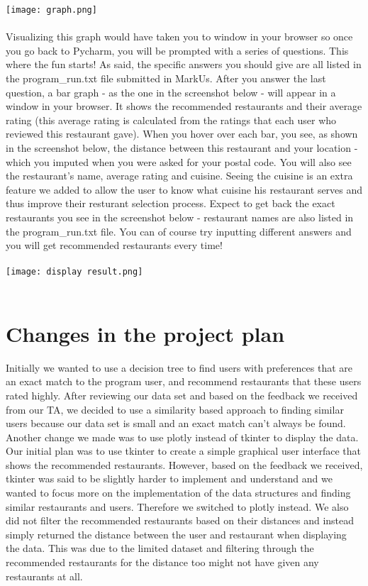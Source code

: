 \documentclass{article}
\begin{document}
\texttt{[image: graph.png]}
\\\\

Visualizing this graph would have taken you to window in your browser so once you go back to Pycharm, you will be prompted with a series of questions. This where the fun starts! As said, the specific answers you should give are all listed in the program\_run.txt file submitted in MarkUs. After you answer the last question, a bar graph - as the one in the screenshot below - will appear in a window in your browser. It shows the recommended restaurants and their average rating (this average rating is calculated from the ratings that each user who reviewed this restaurant gave). When you hover over each bar, you see, as shown in the screenshot below, the distance between this restaurant and your location - which you imputed when you were asked for your postal code. You will also see the restaurant’s name, average rating and cuisine. Seeing the cuisine is an extra feature we added to allow the user to know what cuisine his restaurant serves and thus improve their resturant selection process. Expect to get back the exact restaurants you see in the screenshot below - restaurant names are also listed in the program\_run.txt file. You can of course try inputting different answers and you will get recommended restaurants every time!
\\\\

\texttt{[image: display result.png]}
\\\\

\section{Changes in the project plan}


Initially we wanted to use a decision tree to find users with preferences that are an exact match to the program user, and recommend restaurants that these users rated highly. After reviewing our data set and based on the feedback we received from our TA, we decided to use a similarity based approach to finding similar users because our data set is small and an exact match can’t  always be found. Another change we made was to use plotly instead of tkinter to display the data. Our initial plan was to use tkinter to create a simple graphical user interface that shows the recommended restaurants. However, based on the feedback we received, tkinter was said to be slightly harder to implement and understand and we wanted to focus more on the implementation of the data structures and finding similar restaurants and users. Therefore we switched to plotly instead. 
We also did not filter the recommended restaurants based on their distances and instead simply returned the distance between the user and restaurant when displaying the data. This was due to the limited dataset and filtering through the recommended restaurants for the distance too might not have given any restaurants at all. 
\end{document}
